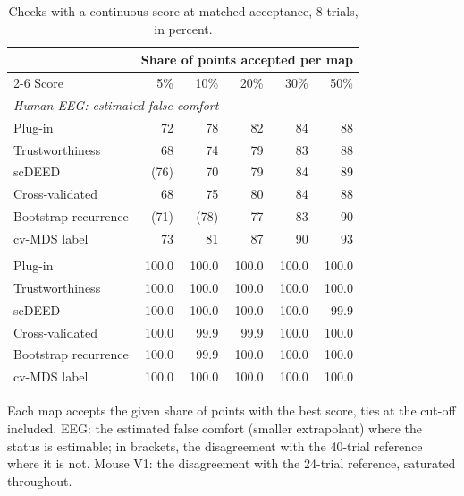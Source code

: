 \documentclass[11pt]{article}
\newcommand{\tablenote}[1]{\par\smallskip\noindent
  \begin{minipage}{\linewidth}\footnotesize\setlength{\parindent}{0pt}#1\end{minipage}}
\begin{document}
\begin{table}[!htb]
\centering\small
\caption{Checks with a continuous score at matched acceptance, 8 trials, in percent.}
\begin{tabular}{lrrrrr}
\toprule
 & \multicolumn{5}{c}{Share of points accepted per map} \\
\cmidrule(lr){2-6}
Score & 5\% & 10\% & 20\% & 30\% & 50\% \\
\midrule
\multicolumn{6}{l}{\textit{Human EEG: estimated false comfort}} \\
\quad Plug-in & 72 & 78 & 82 & 84 & 88 \\
\quad Trustworthiness & 68 & 74 & 79 & 83 & 88 \\
\quad scDEED & (76) & 70 & 79 & 84 & 89 \\
\quad Cross-validated & 68 & 75 & 80 & 84 & 88 \\
\quad Bootstrap recurrence & (71) & (78) & 77 & 83 & 90 \\
\quad cv-MDS label & 73 & 81 & 87 & 90 & 93 \\
\addlinespace
\multicolumn{6}{l}{\textit{Mouse V1: disagreement with the 24-trial reference}} \\
\quad Plug-in & 100.0 & 100.0 & 100.0 & 100.0 & 100.0 \\
\quad Trustworthiness & 100.0 & 100.0 & 100.0 & 100.0 & 100.0 \\
\quad scDEED & 100.0 & 100.0 & 100.0 & 100.0 & 99.9 \\
\quad Cross-validated & 100.0 & 99.9 & 99.9 & 100.0 & 100.0 \\
\quad Bootstrap recurrence & 100.0 & 99.9 & 100.0 & 100.0 & 100.0 \\
\quad cv-MDS label & 100.0 & 100.0 & 100.0 & 100.0 & 100.0 \\
\bottomrule
\end{tabular}
\tablenote{Each map accepts the given share of points with the best score, ties at the cut-off included.
EEG: the estimated false comfort (smaller extrapolant) where the status is estimable; in brackets, the disagreement with the 40-trial reference where it is not.
Mouse V1: the disagreement with the 24-trial reference, saturated throughout.}
\end{table}
\end{document}
